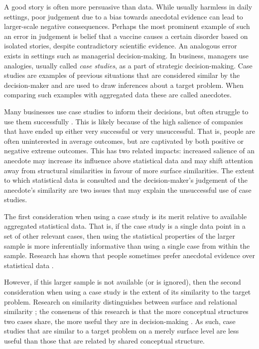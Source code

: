 \documentclass[a4paper, nobind, dvipsnames]{templates/ociamthesis}
\theoremstyle{definition}
\theoremstyle{definition}
\theoremstyle{definition}
\theoremstyle{definition}
\theoremstyle{remark}
\begin{document}
A good story is often more persuasive than data. While usually harmless in daily
settings, poor judgement due to a bias towards anecdotal evidence can lead to
larger-scale negative consequences. Perhaps the most prominent example of such
an error in judgement is belief that a vaccine causes a certain disorder based
on isolated stories, despite contradictory scientific evidence. An analogous
error exists in settings such as managerial decision-making. In business,
managers use analogies, usually called \emph{case studies}, as a part of strategic
decision-making. Case studies are examples of previous situations that are
considered similar by the decision-maker and are used to draw inferences about a
target problem. When comparing such examples with aggregated data these are
called anecdotes.

Many businesses use case studies to inform their decisions, but often struggle
to use them successfully \autocite{gavetti2005a}. This is likely because of the high
salience of companies that have ended up either very successful or very
unsuccessful. That is, people are often uninterested in average outcomes, but
are captivated by both positive or negative extreme outcomes. This has two
related impacts: increased salience of an anecdote may increase its influence
above statistical data and may shift attention away from structural similarities
in favour of more surface similarities. The extent to which statistical data is
consulted and the decision-maker's judgement of the anecdote's similarity are
two issues that may explain the unsuccessful use of case studies.

The first consideration when using a case study is its merit relative to
available aggregated statistical data. That is, if the case study is a single
data point in a set of other relevant cases, then using the statistical
properties of the larger sample is more inferentially informative than using a
single case from within the sample. Research has shown that people sometimes
prefer anecdotal evidence over statistical data \autocites[e.g.,][]{reinard1988,shen2015,jaramillo2019}.

However, if this larger sample is not available (or is ignored), then the second
consideration when using a case study is the extent of its similarity to the
target problem. Research on similarity distinguishes between surface and
relational similarity \autocite{gentner1983}; the consensus of this research is that the
more conceptual structures two cases share, the more useful they are in
decision-making \autocite{markman1995,lassaline1996}. As such, case studies that are
similar to a target problem on a merely surface level are less useful than those
that are related by shared conceptual structure.
\end{document}
